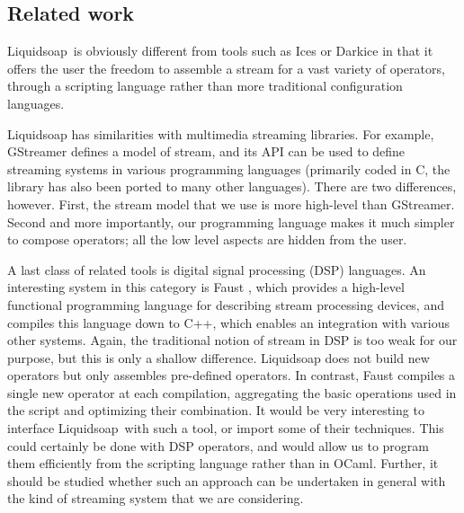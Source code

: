 \documentclass{llncs}
\newcommand{\liquidsoap}{Liquidsoap}
\begin{document}
\subsection{Related work}

\liquidsoap\ is obviously different from tools such as Ices or Darkice in
that it offers the user the freedom to assemble a stream
for a vast variety of operators, through a scripting
language rather than more traditional configuration languages.

Liquidsoap has similarities with multimedia streaming libraries.
For example, GStreamer defines a model of stream, and its API
can be used to define streaming systems in various programming
languages (primarily coded in C, the library has also been
ported to many other languages).
There are two differences, however.
First, the stream model that we use is more high-level than
GStreamer. %
Second and more importantly,
our programming language makes it much simpler
to compose operators; all the low level aspects are hidden
from the user.

A last class of related tools is digital signal processing (DSP) languages.
An interesting system in this category is Faust \cite{faust},
which provides a high-level functional programming language for
describing stream processing devices,
and compiles this language down to C++, which enables an integration
with various other systems.
Again, the traditional notion of stream in DSP is too weak for our
purpose, but this is only a shallow difference.
Liquidsoap does not build new operators but only assembles pre-defined
operators. In contrast, Faust compiles a single new operator at each
compilation, aggregating the basic operations used in the script
and optimizing their combination.
It would be very interesting to interface \liquidsoap\ with such a tool,
or import some of their techniques. This could certainly be done with
DSP operators, and would allow us to program them efficiently from
the scripting language rather than in OCaml. Further, it should
be studied whether such an approach can be undertaken in general with
the kind of streaming system that we are considering.

~

\end{document}
